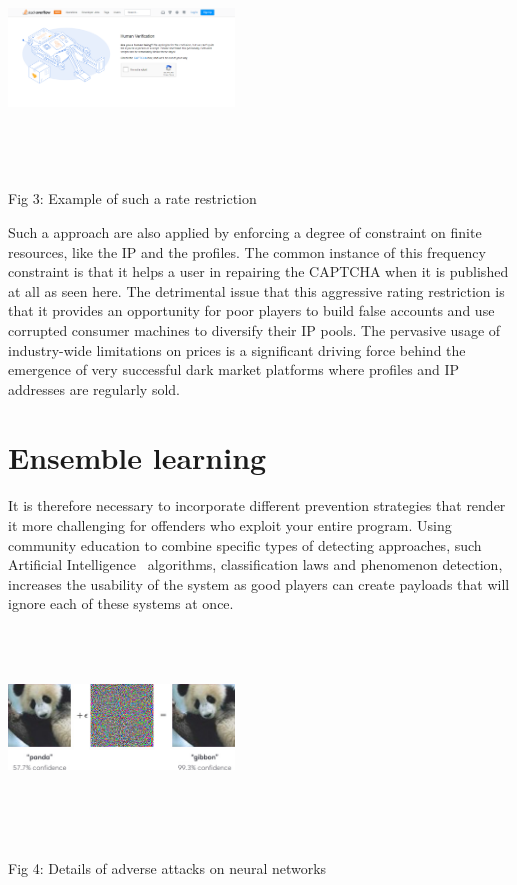 \documentclass[journal,twoside,web]{ieeecolor}
\begin{document}
\newline
\includegraphics[width=0.45\textwidth,height=6cm]{pictures/3..png}
\begin{center}
Fig 3: Example of such a rate restriction
\end{center}


Such a approach are also applied by enforcing a degree of constraint on finite resources, like the IP and the profiles. The common instance of this frequency constraint is that it helps a user in repairing the CAPTCHA when it is published at all as seen here.
The detrimental issue that this aggressive rating restriction is that it provides an opportunity for poor players to build false accounts and use corrupted consumer machines to diversify their IP pools. The pervasive usage of industry-wide limitations on prices is a significant driving force behind the emergence of very successful dark market platforms where profiles and IP addresses are regularly sold.

\section{ Ensemble learning}
It is therefore necessary to incorporate different prevention strategies that render it more challenging for offenders who exploit your entire program. Using community education to combine specific types of detecting approaches, such Artificial Intelligence  algorithms, classification laws and phenomenon detection, increases the usability of the system as good players can create payloads that will ignore each of these systems at once.\\

\newline
\includegraphics[width=0.45\textwidth,height=6cm]{pictures/4..png}
\begin{center}
Fig 4: Details of adverse attacks on neural networks
\end{center}
\end{document}
